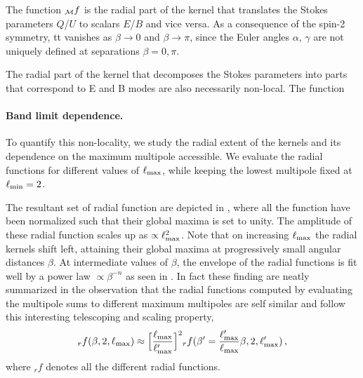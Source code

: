 The function ${_{\mathcal{M}}f}$ is the radial part of the kernel that translates the Stokes parameters $Q$/$U$ to scalars $E$/$B$ and vice versa.  As a consequence of the spin-2 symmetry, tt vanishes as $\beta \rightarrow 0$ and $\beta \rightarrow \pi$, since the Euler angles $\alpha$, $\gamma$ are not uniquely defined at separations $\beta=0,\pi$.

The radial part of the kernel that decomposes the  Stokes parameters into parts that correspond to E and B modes  are also  necessarily non-local.  The function 



\paragraph{Band limit dependence.} 
To quantify this non-locality, we study the radial extent of the kernels and its dependence on the maximum multipole accessible. We evaluate the radial functions for different values of $\ell_{\rm max}$, while keeping the lowest multipole fixed at $\ell_{\rm min}=2$. 

The resultant set of radial function are depicted in , where all the function have been normalized such that their global maxima is set to unity. The amplitude of these radial function scales up as $\propto \ell_{\rm max}^2$. Note that on increasing $\ell_{\rm max}$ the radial kernels shift left, attaining their global maxima at progressively small angular distances $\beta$.  At intermediate values of $\beta$, the envelope of the radial functions is fit well by a power law $ \propto \beta^{-n}$ as seen in .
In fact these finding are neatly summarized in the observation that the radial functions computed by evaluating the multipole sums to different maximum multipoles are self similar and follow this interesting telescoping and scaling property, $${}_rf(\beta,2,\ell_{\rm max}) \approx \Big[\frac{\ell_{\rm max}}{\ell'_{\rm max}}\Big]^2{}_rf(\beta'=\frac{\ell'_{\rm max}}{\ell_{\rm max}} \beta ,2,\ell'_{\rm max}) \,,$$ where ${}_rf$ denotes all the different radial functions.

